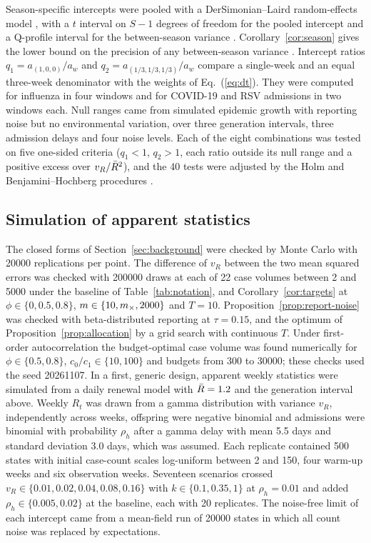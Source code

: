 Season-specific intercepts were pooled with a DerSimonian--Laird random-effects model \citep{dersimonian1986meta}, with a $t$ interval on $S-1$ degrees of freedom for the pooled intercept and a Q-profile interval for the between-season variance \citep{viechtbauer2007confidence}. Corollary~\ref{cor:season} gives the lower bound on the precision of any between-season variance \citep{searle1992variance}. Intercept ratios $q_1=a_{(1,0,0)}/a_{w}$ and $q_2=a_{(1/3,1/3,1/3)}/a_{w}$ compare a single-week and an equal three-week denominator with the weights of Eq.~(\ref{eq:dt}). They were computed for influenza in four windows and for COVID-19 and RSV admissions in two windows each. Null ranges came from simulated epidemic growth with reporting noise but no environmental variation, over three generation intervals, three admission delays and four noise levels. Each of the eight combinations was tested on five one-sided criteria ($q_1<1$, $q_2>1$, each ratio outside its null range and a positive excess over $v_R/\bar{R}^2$), and the 40 tests were adjusted by the Holm and Benjamini--Hochberg procedures \citep{holm1979simple, benjamini1995controlling}.

\subsection{Simulation of apparent statistics}
\label{sec:meth-sim}

The closed forms of Section~\ref{sec:background} were checked by Monte Carlo with 20000 replications per point. The difference of $v_R$ between the two mean squared errors was checked with 200000 draws at each of 22 case volumes between 2 and 5000 under the baseline of Table~\ref{tab:notation}, and Corollary~\ref{cor:targets} at $\phi\in\{0,0.5,0.8\}$, $m\in\{10,m_{\times},2000\}$ and $T=10$. Proposition~\ref{prop:report-noise} was checked with beta-distributed reporting at $\tau=0.15$, and the optimum of Proposition~\ref{prop:allocation} by a grid search with continuous $T$. Under first-order autocorrelation the budget-optimal case volume was found numerically for $\phi\in\{0.5,0.8\}$, $c_0/c_1\in\{10,100\}$ and budgets from 300 to 30000; these checks used the seed 20261107. In a first, generic design, apparent weekly statistics were simulated from a daily renewal model with $\bar{R}=1.2$ and the generation interval above. Weekly $R_t$ was drawn from a gamma distribution with variance $v_R$, independently across weeks, offspring were negative binomial and admissions were binomial with probability $\rho_h$ after a gamma delay with mean 5.5 days and standard deviation 3.0 days, which was assumed. Each replicate contained 500 states with initial case-count scales log-uniform between 2 and 150, four warm-up weeks and six observation weeks. Seventeen scenarios crossed $v_R\in\{0.01,0.02,0.04,0.08,0.16\}$ with $k\in\{0.1,0.35,1\}$ at $\rho_h=0.01$ and added $\rho_h\in\{0.005,0.02\}$ at the baseline, each with 20 replicates. The noise-free limit of each intercept came from a mean-field run of 20000 states in which all count noise was replaced by expectations.


